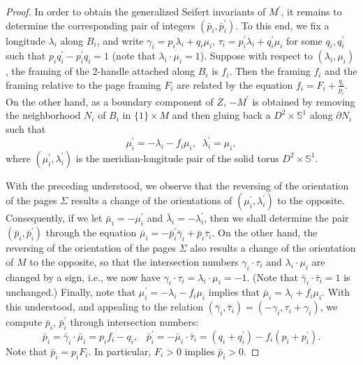 \documentclass[11pt]{amsart}
\theoremstyle{plain}
\numberwithin{theorem}{section}
\theoremstyle{definition}
\newcommand{\s}{{\mathbb S}}
\begin{document}
\begin{proof}
In order to obtain the generalized Seifert invariants of $M^\prime$, it remains to determine the
corresponding pair of integers $(\bar{p}_i,\bar{p}_i^\prime)$. To this end, 
we fix a longitude $\lambda_i$ along $B_i$, and write $\gamma_i=p_i\lambda_i+q_i\mu_i$, 
$\tau_i=p_i^\prime\lambda_i+q^\prime_i\mu_i$ for some $q_i,q_i^\prime$ such that 
$p_iq_i^\prime-p_i^\prime q_i=1$ (note that $\lambda_i\cdot\mu_i=1$). 
Suppose with respect to $(\lambda_i,\mu_i)$, the framing of the $2$-handle attached along $B_i$
is $f_i$. Then the framing $f_i$ and the framing relative to the page framing $F_i$ are related by
the equation $f_i=F_i+\frac{q_i}{p_i}$. On the other hand, as a boundary component of $Z$, 
$-M^\prime$ is obtained by removing the neighborhood $N_i$ of $B_i$ in $\{1\}\times M$ and then
gluing back a $D^2\times \s^1$ along $\partial N_i$ such that 
$$
\mu_i^\prime=-\lambda_i-f_i\mu_i,\;\; \lambda_i^\prime=\mu_i,
$$
where $(\mu_i^\prime,\lambda_i^\prime)$ is the meridian-longitude pair of the solid torus 
$D^2\times \s^1$. 

With the preceding understood, we observe that the reversing of the orientation of the pages $\Sigma$ 
results a change of the orientations of $(\mu_i^\prime,\lambda_i^\prime)$ to the opposite. Consequently, if we let $\bar{\mu}_i=-\mu_i^\prime$ and $\bar{\lambda}_i=-\lambda_i^\prime$, 
then we shall determine the pair $(\bar{p}_i,\bar{p}_i^\prime)$ through the equation
$\bar{\mu}_i=-\bar{p}_i ^\prime\bar{\gamma}_i+\bar{p}_i \bar{\tau}_i$. On the other hand, 
the reversing of the orientation of the pages $\Sigma$ also results a change of the orientation of
$M$ to the opposite, so that the intersection numbers $\gamma_i\cdot\tau_i$ and 
$\lambda_i\cdot \mu_i$ are changed by a sign, i.e., we now have 
$\gamma_i\cdot\tau_i=\lambda_i\cdot \mu_i=-1$. (Note that $\bar{\gamma}_i\cdot \bar{\tau}_i=1$
is unchanged.) Finally, note that $\mu_i^\prime=-\lambda_i-f_i\mu_i$ implies that 
$\bar{\mu}_i=\lambda_i+f_i\mu_i$. With this understood, and appealing to the relation
$(\bar{\gamma}_i,\bar{\tau}_i)=(-\gamma_i, \tau_i+\gamma_i)$, we compute $\bar{p}_i$, 
$\bar{p}_i^\prime$ through intersection numbers:
$$
\bar{p}_i=\bar{\gamma}_i\cdot \bar{\mu}_i=p_if_i-q_i, \;\;\; 
\bar{p}_i^\prime=-\bar{\mu}_i\cdot \bar{\tau}_i=(q_i+q_i^\prime)-f_i(p_i+p_i^\prime).
$$
Note that $\bar{p}_i=p_i F_i$. In particular, $F_i>0$ implies $\bar{p}_i>0$.


\end{proof}
\end{document}
